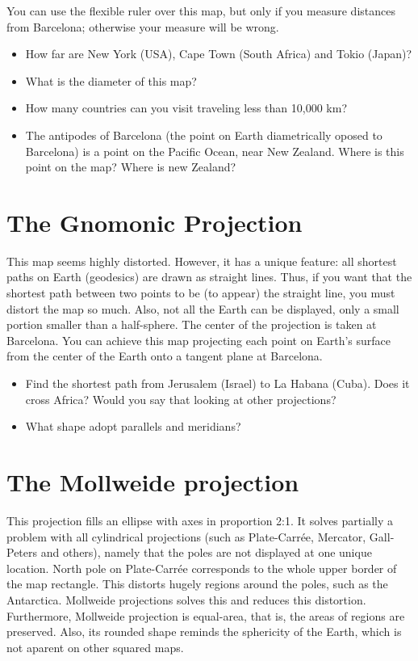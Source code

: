 \documentclass[a4paper,12pt]{article}
\begin{document}
You can use the flexible ruler over this map, but only if you measure distances from Barcelona; otherwise your measure will be
wrong. 
\begin{itemize}
 \item How far are New York (USA), Cape Town (South Africa) and Tokio (Japan)?
 \item What is the diameter of this map?
 \item How many countries can you visit traveling less than 10,000 km?
 \item The antipodes of Barcelona (the point on Earth diametrically oposed to Barcelona) is a point on the Pacific Ocean, near New Zealand.
Where is this point on the map? Where is new Zealand?
\end{itemize}



\newpage
\section{The Gnomonic Projection}
This map seems highly distorted. However, it has a unique feature: all shortest paths on Earth (geodesics) are drawn as straight lines.
Thus, if you want that the shortest path between two points to be (to appear) the straight line, you must distort the map so much. Also,
not all the Earth can be displayed, only a small portion smaller than a half-sphere. The center of the projection is taken at Barcelona.
You can achieve this map projecting each point on Earth's surface from the center of the Earth onto a tangent plane at Barcelona.

\begin{itemize}
 \item Find the shortest path from Jerusalem (Israel) to La Habana (Cuba). Does it cross Africa? Would you say that looking at other
projections?
 \item What shape adopt parallels and meridians?
\end{itemize}





\newpage
\section{The Mollweide projection}
This projection fills an ellipse with axes in proportion 2:1. It solves partially a problem with all cylindrical projections (such as
Plate-Carrée, Mercator, Gall-Peters and others), namely that the poles are not displayed at one unique location. North pole on Plate-Carrée
corresponds to the whole upper border of the map rectangle. This distorts hugely regions around the poles, such as the Antarctica.
Mollweide projections solves this and reduces this distortion. Furthermore, Mollweide projection is equal-area, that is, the areas of
regions are preserved. Also, its rounded shape reminds the sphericity of the Earth, which is not aparent on other squared maps.
\end{document}
